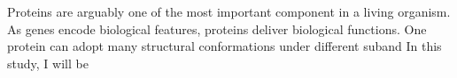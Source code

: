 Proteins are arguably one of the most important component in a living organism. As genes encode biological features, proteins deliver biological functions. One protein can adopt many structural conformations under different suband   In this study, I will be 